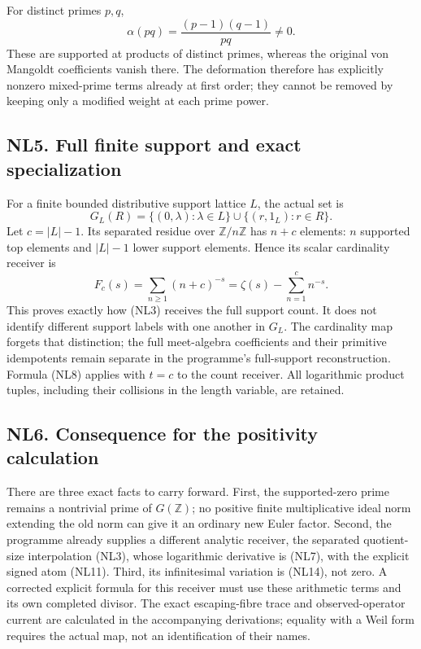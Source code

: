 \documentclass[
  10pt,
  a4paper,
]{article}
\begin{document}
For distinct primes \(p,q\), \[
\alpha(pq)=\frac{(p-1)(q-1)}{pq}\ne0.
\tag{NL16}
\] These are supported at products of distinct primes, whereas the
original von Mangoldt coefficients vanish there. The deformation
therefore has explicitly nonzero mixed-prime terms already at first
order; they cannot be removed by keeping only a modified weight at each
prime power.

\subsection{NL5. Full finite support and exact
specialization}\label{nl5.-full-finite-support-and-exact-specialization}

For a finite bounded distributive support lattice \(L\), the actual set
is \[
G_L(R)=\{(0,\lambda):\lambda\in L\}\cup\{(r,1_L):r\in R\}.
\tag{NL17}
\] Let \(c=|L|-1\). Its separated residue over \(\mathbb Z/n\mathbb Z\)
has \(n+c\) elements: \(n\) supported top elements and \(|L|-1\) lower
support elements. Hence its scalar cardinality receiver is \[
F_c(s)=\sum_{n\ge1}(n+c)^{-s}
=\zeta(s)-\sum_{n=1}^{c}n^{-s}.
\tag{NL18}
\] This proves exactly how (NL3) receives the full support count. It
does not identify different support labels with one another in \(G_L\).
The cardinality map forgets that distinction; the full meet-algebra
coefficients and their primitive idempotents remain separate in the
programme's full-support reconstruction. Formula (NL8) applies with
\(t=c\) to the count receiver. All logarithmic product tuples, including
their collisions in the length variable, are retained.

\subsection{NL6. Consequence for the positivity
calculation}\label{nl6.-consequence-for-the-positivity-calculation}

There are three exact facts to carry forward. First, the supported-zero
prime remains a nontrivial prime of \(G(\mathbb Z)\); no positive finite
multiplicative ideal norm extending the old norm can give it an ordinary
new Euler factor. Second, the programme already supplies a different
analytic receiver, the separated quotient-size interpolation (NL3),
whose logarithmic derivative is (NL7), with the explicit signed atom
(NL11). Third, its infinitesimal variation is (NL14), not zero. A
corrected explicit formula for this receiver must use these arithmetic
terms and its own completed divisor. The exact escaping-fibre trace and
observed-operator current are calculated in the accompanying
derivations; equality with a Weil form requires the actual map, not an
identification of their names.
\end{document}
